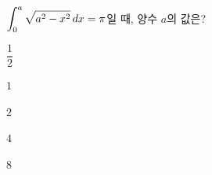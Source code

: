\hspace*{2mm}\begin{minipage}[t]{\dimexpr\linewidth-2mm\relax}\vspace{0pt}
$\displaystyle\int_{0}^{a}\sqrt{a^2-x^2}\mkern3mu dx=\pi$일 때, 양수 $a$의 값은?
\begin{choices32}{\rule[-3ex]{0pt}{8ex}$\dfrac{1}{2}$}{\rule[-3ex]{0pt}{8ex}$1$}{\rule[-3ex]{0pt}{8ex}$2$}{\rule[-3ex]{0pt}{8ex}$4$}{\rule[-3ex]{0pt}{8ex}$8$}\end{choices32}\end{minipage}
